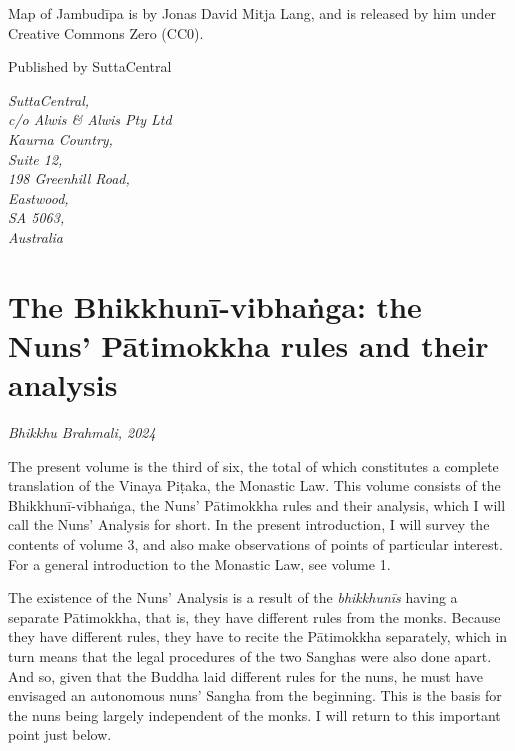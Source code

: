 \documentclass[12pt,openany]{book}%
\newcommand*{\scbyline}[1]{\begin{flushright}\textit{#1}\end{flushright}\bigskip}
\begin{document}
\begin{footnotesize}
Map of Jambudīpa is by Jonas David Mitja Lang, and is released by him under Creative Commons Zero (CC0).

\medskip

Published by SuttaCentral

\medskip

\textit{SuttaCentral,\\
c/o Alwis \& Alwis Pty Ltd\\
Kaurna Country,\\
Suite 12,\\
198 Greenhill Road,\\
Eastwood,\\
SA 5063,\\
Australia}

\end{footnotesize}

\newpage

\setlength{\parindent}{1em}%
\tableofcontents
\newpage
\pagestyle{fancy}
%
\chapter*{The \textsanskrit{Bhikkhunī}-\textsanskrit{vibhaṅga}: the Nuns’ \textsanskrit{Pātimokkha} rules and their analysis}

\scbyline{Bhikkhu Brahmali, 2024}

The present volume is the third of six, the total of which constitutes a complete translation of the Vinaya \textsanskrit{Piṭaka}, the Monastic Law. This volume consists of the \textsanskrit{Bhikkhunī}-\textsanskrit{vibhaṅga}, the Nuns’ \textsanskrit{Pātimokkha} rules and their analysis, which I will call the Nuns’ Analysis for short. In the present introduction, I will survey the contents of volume 3, and also make observations of points of particular interest. For a general introduction to the Monastic Law, see volume 1.

The existence of the Nuns’ Analysis is a result of the \textit{\textsanskrit{bhikkhunīs}} having a separate \textsanskrit{Pātimokkha}, that is, they have different rules from the monks. Because they have different rules, they have to recite the \textsanskrit{Pātimokkha} separately, which in turn means that the legal procedures of the two Sanghas were also done apart. And so, given that the Buddha laid different rules for the nuns, he must have envisaged an autonomous nuns’ Sangha from the beginning. This is the basis for the nuns being largely independent of the monks. I will return to this important point just below.
\end{document}

